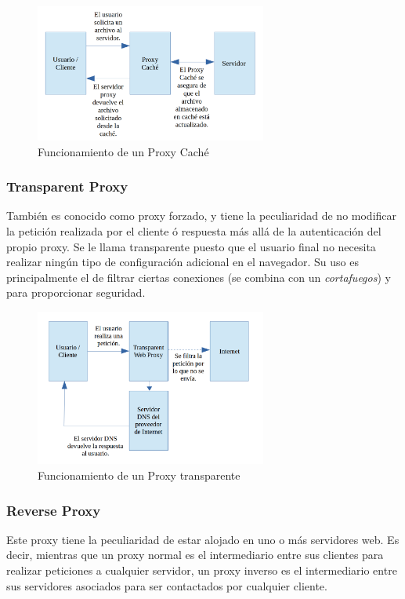 \begin{figure}[h]
	\centerline{
		\mbox{\includegraphics[width=3.00in]{images/proxy_cache.png}}
	}
	\caption{Funcionamiento de un Proxy Caché}
	\label{fig:norm_Daugman}
\end{figure}

\subsubsection{Transparent Proxy}

También es conocido como proxy forzado, y tiene la peculiaridad de no modificar la petición realizada por el cliente ó respuesta más allá de la autenticación del propio proxy.
Se le llama transparente puesto que el usuario final no necesita realizar ningún tipo de configuración adicional en el navegador.
Su uso es principalmente el de filtrar ciertas conexiones (se combina con un \textit{cortafuegos}) y para proporcionar seguridad.

\begin{figure}[h]
	\centerline{
		\mbox{\includegraphics[width=3.00in]{images/proxy_transparent.png}}
	}
	\caption{Funcionamiento de un Proxy transparente}
	\label{fig:norm_Daugman}
\end{figure}

\subsubsection{Reverse Proxy}

Este proxy tiene la peculiaridad de estar alojado en uno o más servidores web.
Es decir, mientras que un proxy normal es el intermediario entre sus clientes para realizar peticiones a cualquier servidor, un proxy inverso es el intermediario entre sus servidores asociados para ser contactados por cualquier cliente.

